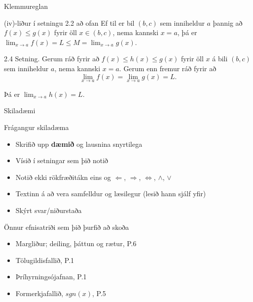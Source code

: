 \documentclass[icelandic,a4paper,12pt]{article}
\begin{document}
\begin{frame}{Klemmureglan}

\pause

\begin{block}{(iv)-liður í setningu 2.2 að ofan}
Ef til er bil $(b,c)$ sem inniheldur $a$ þannig að 
$f(x)\leq g(x)$ fyrir öll $x\in (b,c)$, nema kannski $x=a$, þá er
 $\lim_{x\rightarrow a}f(x)=L\leq M=\lim_{x\rightarrow a}g(x)$.
\end{block}

\pause

\begin{block}{2.4 Setning.}  Gerum ráð fyrir að $f(x)\leq
h(x)\leq g(x)$ fyrir öll $x$ á bili $(b, c)$ sem
inniheldur $a$, nema kannski $x=a$.  Gerum enn fremur ráð fyrir að 
$$\lim_{x\rightarrow a}f(x)=\lim_{x\rightarrow a}g(x)=L.$$

\pause

Þá er $\lim_{x\rightarrow a}h(x)=L$.
 \end{block}
\end{frame}


\begin{frame}{Skiladæmi}
 \begin{block}{Frágangur skiladæma}
 \begin{itemize}
 \item Skrifið upp {\bf dæmið} og lausnina snyrtilega
 \pause
 \item Vísið í setningar sem þið notið
 \pause
 \item Notið ekki rökfræðitákn eins og $\Leftarrow$, 
 $\Rightarrow$, $\Leftrightarrow$, $\wedge$, $\vee$
 \pause
 \item Textinn á að vera samfelldur og læsilegur (lesið hann 
 sjálf yfir)
 \pause
 \item Skýrt svar/niðurstaða
 \end{itemize}
 \end{block}
 
% 
 
\end{frame}

\begin{frame}{Önnur efnisatriði sem þið þurfið að skoða}

\begin{itemize}
\item Margliður; deiling, þáttun og rætur, P.6
\item Tölugildisfallið, P.1
\item Þríhyrningsójafnan, P.1
 \item Formerkjafallið, $sgn(x)$, P.5
\end{itemize}

 
\end{frame}
\date{5.~september 2012}
\end{document}
